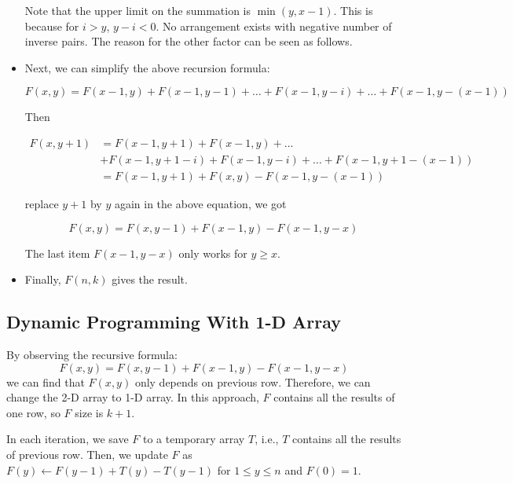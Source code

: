 \begin{itemize}
Note that the upper limit on the summation is $\min(y,x−1)$. This is because for $i>y$, $y−i<0$. No arrangement exists with negative number of inverse pairs. The reason for the other factor can be seen as follows.

\item Next, we can simplify the above recursion formula:

\[F(x,y) = F(x-1,y) + F(x-1, y-1) + \ldots + F(x-1, y-i) + \ldots + F(x-1, y-(x-1))\]

Then 

\begin{align*}
F(x,y+1) &= F(x-1, y+1) + F(x-1, y) + \ldots \\
&+ F(x-1, y+1-i) + F(x-1, y-i) + \ldots + F(x-1, y+1-(x-1)) \\
  &= F(x-1, y+1) + F(x, y) - F(x-1, y-(x-1)) 
\end{align*}

replace $y+1$ by $y$ again in the above equation, we got

\[ F(x,y) = F(x, y-1) + F(x-1, y) - F(x-1, y-x) \]

The last item $F(x-1, y-x)$ only works for $y \geq x$.

\item Finally, $F(n, k)$ gives the result.
\end{itemize}

\subsection{Dynamic Programming With 1-D Array}
By observing the recursive formula:
\[ F(x,y) = F(x, y-1) + F(x-1, y) - F(x-1, y-x) \]
we can find that $F(x,y)$ only depends on previous row. Therefore, we can change the 2-D array to 1-D array. In this approach, $F$ contains all the results of one row, so $F$ size is $k+1$. 

In each iteration, we save $F$ to a temporary array $T$, i.e., $T$ contains all the results of previous row. Then, we update $F$ as $F(y)\gets F(y-1) + T(y) - T(y-1)$ for $1\leq y\leq n$ and $F(0)=1$.
